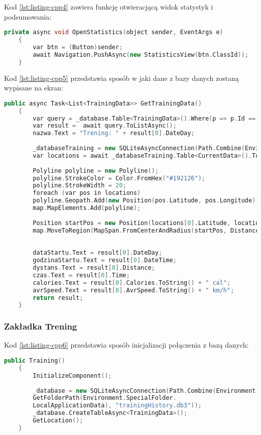 Kod \ref{lst:listing-cpp4} zawiera funkcję otwieracjącą widok statystyk i podsumowania:
\begin{lstlisting}[caption=Otwieranie widoku statystyk i podsumowania, label={lst:listing-cpp4}, language=C++]
	private async void OpenStatistics(object sender, EventArgs e)
	{
		var btn = (Button)sender;
		await Navigation.PushAsync(new StatisticsView(btn.ClassId));
	}
\end{lstlisting}

Kod \ref{lst:listing-cpp5} przedstawia sposób w jaki dane z bazy danych zostaną wypisane na ekran:
\begin{lstlisting}[caption=Wypisanie danych z bazy danych na ekran, label={lst:listing-cpp5}, language=C++]
	public async Task<List<TrainingData>> GetTrainingData()
	{
		var query = _database.Table<TrainingData>().Where(p => p.Id == buttonId);
		var result =  await query.ToListAsync();
		nazwa.Text = "Trening: " + result[0].DateDay;
		
		_databaseTraining = new SQLiteAsyncConnection(Path.Combine(Environment.GetFolderPath(Environment.SpecialFolder.LocalApplicationData), result[0].TrainingDatabase));
		var locations = await _databaseTraining.Table<CurrentData>().ToListAsync();
		
		Polyline polyline = new Polyline();
		polyline.StrokeColor = Color.FromHex("#192126");
		polyline.StrokeWidth = 20;
		foreach (var pos in locations)
		polyline.Geopath.Add(new Position(pos.Latitude, pos.Longitude));
		map.MapElements.Add(polyline);
		
		Position startPos = new Position(locations[0].Latitude, locations[0].Longitude);
		map.MoveToRegion(MapSpan.FromCenterAndRadius(startPos, Distance.FromKilometers(1)));
		
		
		dataStartu.Text = result[0].DateDay;
		godzinaStartu.Text = result[0].DateTime;
		dystans.Text = result[0].Distance;
		czas.Text = result[0].Time;
		calories.Text = result[0].Calories.ToString() + " cal";
		avrSpeed.Text = result[0].AvrSpeed.ToString() + " km/h";
		return result;
	}
\end{lstlisting}

\subsubsection{Zakładka Trening} %

\hspace{0.60cm}Kod \ref{lst:listing-cpp6} przedstawia sposób inicjalizacji połączenia z bazą danych:
\begin{lstlisting}[caption=Połączenie z bazą danych, label={lst:listing-cpp6}, language=C++]
	public Training()
	{
		InitializeComponent();
		
		_database = new SQLiteAsyncConnection(Path.Combine(Environment.
		GetFolderPath(Environment.SpecialFolder.
		LocalApplicationData), "trainingHistory.db3"));
		_database.CreateTableAsync<TrainingData>();
		GetLocation();
	}
\end{lstlisting}

